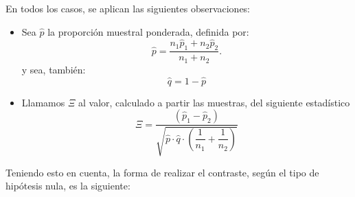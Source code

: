En todos los casos, se aplican las siguientes observaciones:
\begin{itemize}

  \item Sea $\hat p$ la {\sf proporción muestral ponderada}, definida por:
    \begin{equation}\label{cap09:ecu:ProporcionMuestralPonderada}
        \hat p=\dfrac{n_1\hat p_1+n_2\hat p_2}{n_1+n_2}.
    \end{equation}
    y sea, también:
    \[\hat q=1-\hat p\]

  \item Llamamos $\Xi$ al valor, calculado a partir las muestras, del siguiente estadístico
    \begin{equation}
    \label{cap09:ecu:EstadisticoContrasteDifProporciones}
    \Xi=\dfrac{\left(\hat p_1-\hat p_2\right)}{\sqrt{\hat p\cdot \hat q \cdot\left(\dfrac{1}{n_1}+\dfrac{1}{n_2}\right)}}
    \end{equation}
\end{itemize}
Teniendo esto en cuenta, la forma de realizar el contraste, según el tipo de hipótesis nula, es la siguiente:

